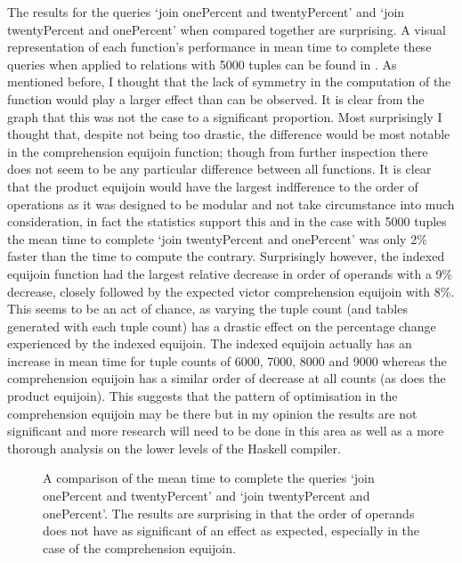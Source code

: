 The results for the queries `join onePercent and twentyPercent' and `join
twentyPercent and onePercent' when compared together are surprising. A visual
representation of each function's performance in mean time to complete these
queries when applied to relations with 5000 tuples can be found in 
. As mentioned before,
I thought that the lack of symmetry in the computation of the function would
play a larger effect than can be observed. It is clear from the graph that this
was not the case to a significant proportion. Most surprisingly I thought that,
despite not being too drastic, the difference would be most notable in the
comprehension equijoin function; though from further inspection there does not
seem to be any particular difference between all functions. It is clear that the
product equijoin would have the largest indfference to the order of operations
as it was designed to be modular and not take circumstance into much
consideration, in fact the statistics support this and in the case with 5000
tuples the mean time to complete `join twentyPercent and onePercent' was only
2\% faster than the time to compute the contrary. Surprisingly however, the
indexed equijoin function had the largest relative decrease in order of operands
with a 9\% decrease, closely followed by the expected victor comprehension
equijoin with 8\%. This seems to be an act of chance, as varying the tuple count
(and tables generated with each tuple count) has a drastic effect on the
percentage change experienced by the indexed equijoin. The indexed equijoin
actually has an increase in mean time for tuple counts of 6000, 7000, 8000 and
9000 whereas the comprehension equijoin has a similar order of decrease at all
counts (as does the product equijoin). This suggests that the pattern of
optimisation in the comprehension equijoin may be there but in my opinion the
results are not significant and more research will need to be done in this area
as well as a more thorough analysis on the lower levels of the Haskell compiler.

\begin{figure}[p]
    
    \caption{A comparison of the mean time to complete the queries `join
    onePercent and twentyPercent' and `join twentyPercent and onePercent'. The
results are surprising in that the order of operands does not have as
significant of an effect as expected, especially in the case of the
comprehension equijoin.}
    \label{fig:benchmark:onePercent-twentyPercent-flipped-5000}
\end{figure}

